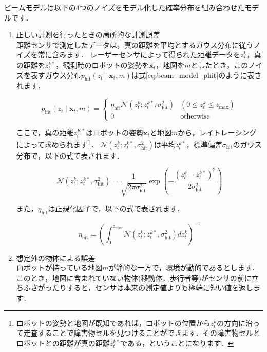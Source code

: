 \documentclass[{../../master}]{subfiles}
\begin{document}
ビームモデルは以下の4つのノイズをモデル化した確率分布を組み合わせたモデルです．

\begin{enumerate}
  \item 正しい計測を行ったときの局所的な計測誤差 \\
  距離センサで測定したデータは，真の距離を平均とするガウス分布に従うノイズを常に含みます．
  レーザーセンサによって得られた距離データを$z^{k}_{t}$，真の距離を$z^{k*}_{t}$，観測時のロボットの姿勢を$\bm{x}_{t}$，地図を$m$としたとき，このノイズを表すガウス分布$p_{\text{hit}}(z_{t} \mid \bm{x}_{t}, m)$は式\ref{eq:beam_model_phit}のように表されます．

  \begin{equation}
    p_{\text{hit}}(z_{t} \mid \bm{x}_{t}, m) = 
    \begin{cases}
      \eta_{\text{hit}} \mathcal{N}(z^{k}_{t}; z^{k*}_{t}, \sigma^{2}_{\text{hit}}) & (0 \leq z^{k}_{t} \leq z_{\text{max}}) \\
      0 & \text{otherwise}
    \end{cases}
    \label{eq:beam_model_phit}
  \end{equation}

  ここで，真の距離$z^{K*}_{t}$はロボットの姿勢$\bm{x}_{t}$と地図$m$から，レイトレーシングによって求められます\footnote{ロボットの姿勢と地図が既知であれば，ロボットの位置から$z^{k}_{t}$の方向に沿って走査することで障害物セルを見つけることができます．その障害物セルとロボットとの距離が真の距離$z^{k*}_{t}$である，ということになります．}．
  $\mathcal{N}(z^{k}_{t}; z^{k*}_{t}, \sigma^{2}_{\text{hit}})$は平均$z^{k*}_{t}$，標準偏差$\sigma_{\text{hit}}$のガウス分布で，以下の式で表されます．

  \begin{equation}
    \mathcal{N}(z^{k}_{t}; z^{k*}_{t}, \sigma^{2}_{\text{hit}}) = \frac{1}{\sqrt{2\pi\sigma^{2}_{\text{hit}}}} \exp{\left( -\frac{(z^{k}_{t} - z^{k*}_{t})^2}{2\sigma^2_{\text{hit}}} \right)}
  \end{equation}

  また，$\eta_{\text{hit}}$は正規化因子で，以下の式で表されます．

  \begin{equation}
    \eta_{\text{hit}} = \left( \int^{z_{\text{max}}}_{0} \mathcal{N}(z^{k}_{t}; z^{k*}_{t}, \sigma^{2}_{\text{hit}}) dz^{k}_{t} \right)^{-1}
  \end{equation}

  \item 想定外の物体による誤差 \\
  ロボットが持っている地図$m$が静的な一方で，環境が動的であるとします．
  このとき，地図に含まれていない物体(移動体．歩行者等)がセンサの前に立ちふさがったりすると，センサは本来の測定値よりも極端に短い値を返します．
  

\end{enumerate}
\end{document}
